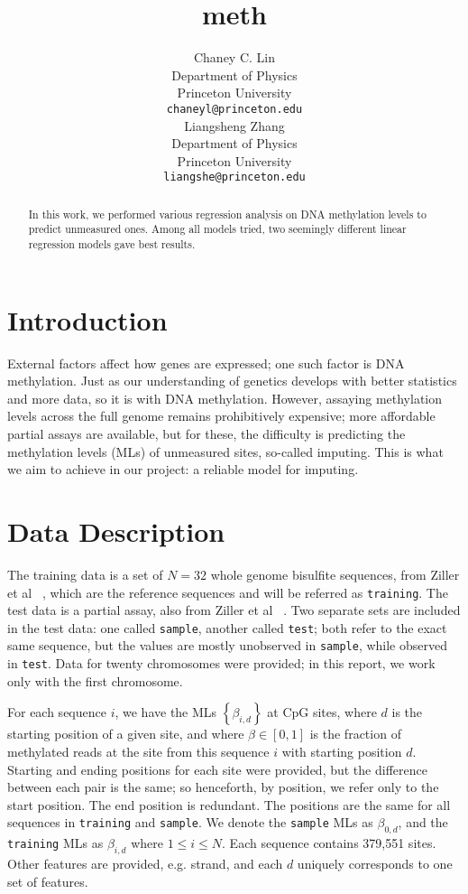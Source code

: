 \documentclass{article} %
\title{meth}
\author{
Chaney C. Lin\\
Department of Physics\\
Princeton University\\
\texttt{chaneyl@princeton.edu} \\
\And
Liangsheng Zhang\\
Department of Physics\\
Princeton University\\
\texttt{liangshe@princeton.edu} \\
}
\begin{document}
\maketitle

\begin{abstract}
In this work, we performed various regression analysis on DNA methylation levels to predict unmeasured ones. Among all models tried, two seemingly different linear regression models gave best results.
\end{abstract}

\section{Introduction}

External factors affect how genes are expressed; one such factor is DNA methylation. Just as our understanding of genetics develops with better statistics and more data, so it is with DNA methylation. However, assaying methylation levels across the full genome remains prohibitively expensive; more affordable partial assays are available, but for these, the difficulty is predicting the methylation levels (MLs) of unmeasured sites, so-called imputing. This is what we aim to achieve in our project: a reliable model for imputing.

\section{Data Description}

The training data is a set of $N = 32$ whole genome bisulfite sequences, from Ziller et al ~\cite{ziller2013charting}, which are the reference sequences and will be referred as \texttt{training}. The test data is a partial assay, also from Ziller et al ~\cite{ziller2013charting}. Two separate sets are included in the test data: one called \texttt{sample}, another called \texttt{test}; both refer to the exact same sequence, but the values are mostly unobserved in \texttt{sample}, while observed in \texttt{test}. Data for twenty chromosomes were provided; in this report, we work only with the first chromosome.

For each sequence $i$, we have the MLs $\left\{\beta_{i,d}\right\}$ at CpG sites, where $d$ is the starting position of a given site, and where $\beta \in [0,1]$ is the fraction of methylated reads at the site from this sequence $i$ with starting position $d$. Starting and ending positions for each site were provided, but the difference between each pair is the same; so henceforth, by position, we refer only to the start position. The end position is redundant. The positions are the same for all sequences in \texttt{training} and \texttt{sample}. We denote the \texttt{sample} MLs as $\beta_{0,d}$, and the \texttt{training} MLs as $\beta_{i,d}$ where $1 \leq i \leq N$. Each sequence contains 379,551 sites. Other features are provided, e.g. strand, and each $d$ uniquely corresponds to one set of features.
\end{document}

